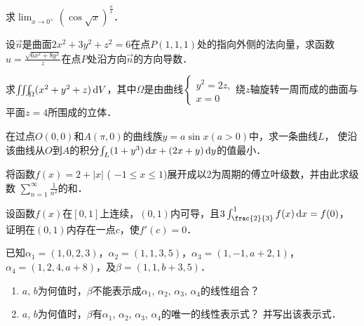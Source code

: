 \documentclass[plain,noanswer,medmath]{../../template/jnuexam}
\begin{document}
\begin{problem}
求$\lim_{x \to 0^+} (\cos \sqrt{x})^{\frac{\pi}{x}}$．
\end{problem}


\begin{problem}
设$\vec{n}$是曲面$2x^2 + 3y^2 + z^2 = 6$在点$P(1,1,1)$处的指向外侧的法向量，求函数
$u = \frac{\sqrt{6x^2 + 8y^2}}{z}$在点$P$处沿方向$\vec{n}$的方向导数．
\end{problem}


\begin{problem}
求$\iiint_{\Omega}(x^2 + y^2 + z)\d V$，其中$\Omega$是由曲线$\begin{cases}
  y^2 = 2z, \\
  x = 0
\end{cases}$绕$z$轴旋转一周而成的曲面与平面$z = 4$所围成的立体．
\end{problem}



\begin{problem}
在过点$O(0,0)$和$A(\pi ,0)$的曲线族$y = a\sin x(a > 0)$中，求一条曲线$L$，
使沿该曲线从$O$到$A$的积分$\int_L (1 + y^3)\mathop{}\!\mathrm{d} x + (2x + y)\mathop{}\!\mathrm{d} y$的值最小．
\end{problem}



\begin{problem}
将函数$f(x) = 2 + |x|$ ( $- 1 \le x \le 1$)展开成以$2$为周期的傅立叶级数，并由此求级数
$\sum_{n = 1}^{\infty}\frac{1}{n^2}$的和．
\end{problem}



\begin{problem}
设函数$f(x)$在$[0,1]$上连续，$(0,1)$内可导，且$3\int_{\frac{2}{3}}^1f(x)\dx = f(0)$，
证明在$(0,1)$内存在一点$c$，使$f'(c) = 0$．
\end{problem}



\begin{problem}
已知$\alpha_1 = (1,0,2,3)$，$\alpha_2 = (1,1,3,5)$，$\alpha_3 = (1, - 1,a + 2,1)$，
$\alpha_4 = (1,2,4,a + 8)$，及$\beta = (1,1,b + 3,5)$．
\begin{enumerate}
\item $a$, $b$为何值时，$\beta$不能表示成$\alpha_1$, $\alpha_2$, $\alpha_3$, $\alpha_4$的线性组合？
\item $a$, $b$为何值时，$\beta$有$\alpha_1$, $\alpha_2$, $\alpha_3$, $\alpha_4$的唯一的线性表示式？
      并写出该表示式．
\end{enumerate}
\end{problem}
\end{document}
